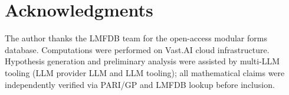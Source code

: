 \documentclass[12pt]{amsart}
\theoremstyle{definition}
\begin{document}
\section*{Acknowledgments}

The author thanks the LMFDB team for the open-access modular forms database.
Computations were performed on Vast.AI cloud infrastructure.
Hypothesis generation and preliminary analysis were assisted by multi-LLM
tooling (LLM provider LLM and LLM tooling); all mathematical claims
were independently verified via PARI/GP and LMFDB lookup before inclusion.

\end{document}
